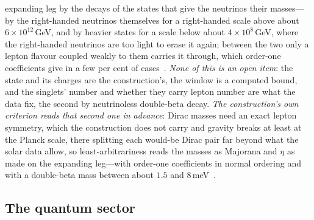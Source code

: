 \documentclass[11pt,a4paper]{article}
\theoremstyle{plain}
\theoremstyle{definition}
\begin{document}
expanding leg by the decays of the states that give the neutrinos their masses---by the right-handed neutrinos
themselves for a right-handed scale above about $6\times10^{12}$\,GeV, and by heavier states for a scale below
about $4\times10^{8}$\,GeV, where the right-handed neutrinos are too light to erase it again; between the two only
a lepton flavour coupled weakly to them carries it through, which order-one coefficients give in a few per cent
of cases~\cite{JanzenCosmogenesis}. \emph{None of this is an open item}: the
state and its charges are the construction's, the window is a computed bound, and the singlets' number and
whether they carry lepton number are what the data fix, the second by neutrinoless double-beta decay. \emph{The
construction's own criterion reads that second one in advance}: Dirac masses need an exact lepton symmetry, which
the construction does not carry and gravity breaks at least at the Planck scale, there splitting each would-be Dirac
pair far beyond what the solar data allow, so least-arbitrariness reads the masses as Majorana and $\eta$ as made on
the expanding leg---with order-one coefficients in normal ordering and with a double-beta mass between about $1.5$
and $8$\,meV~\cite{JanzenCosmogenesis,JanzenShadowExistence}.

\subsection{The quantum sector}
\end{document}
